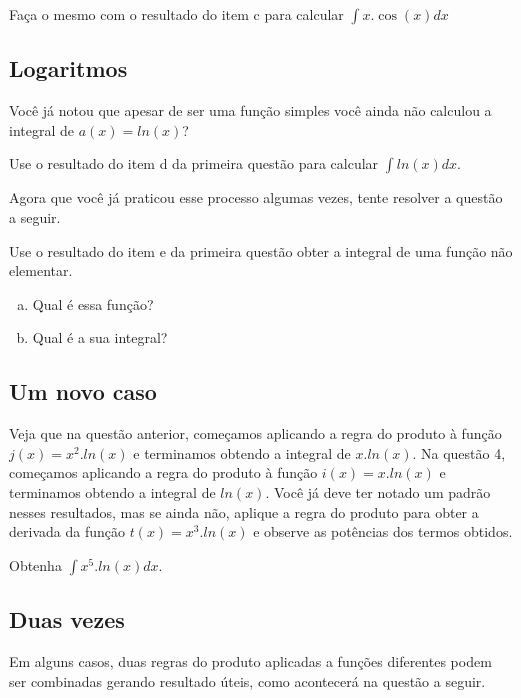 \documentclass[main_estudante.tex]{subfiles}
\begin{document}
\begin{questao}
Faça o mesmo com o resultado do item c para calcular $\int x . \cos(x) dx$
\end{questao}

\subsection*{Logaritmos}

Você já notou que apesar de ser uma função simples você ainda não calculou a integral de $a(x)=ln(x)$? 

\begin{questao}
Use o resultado do item d da primeira questão para calcular $\int ln(x) dx$.
\end{questao}

Agora que você já praticou esse processo algumas vezes, tente resolver a questão a seguir.

\begin{questao}
Use o resultado do item e da primeira questão obter a integral de uma função não elementar.
\begin{enumerate}[a)]
\item Qual é essa função?
\item Qual é a sua integral?
\end{enumerate}
\end{questao}

\subsection*{Um novo caso}

Veja que na questão anterior, começamos aplicando a regra do produto à função $j(x)=x^2 . ln(x)$ e terminamos obtendo a integral de $x.ln(x)$. Na questão 4, começamos aplicando a regra do produto à função $i(x)=x . ln(x)$ e terminamos obtendo a integral de $ln(x)$. Você já deve ter notado um padrão nesses resultados, mas se ainda não, aplique a regra do produto para obter a derivada da função $t(x)=x^3. ln(x)$ e observe as potências dos termos obtidos.

\begin{questao}
Obtenha $\int x^5 . ln(x) dx$.
\end{questao}

\subsection*{Duas vezes}

Em alguns casos, duas regras do produto aplicadas a funções diferentes podem ser combinadas gerando resultado úteis, como acontecerá na questão a seguir.
\end{document}
